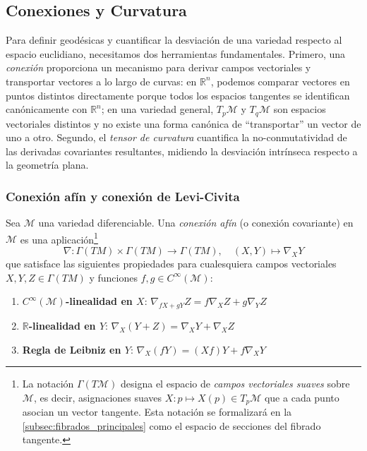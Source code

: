 \subsection{Conexiones y Curvatura}\label{subsec:conexiones_curvatura}

Para definir geodésicas y cuantificar la desviación de una variedad respecto al espacio euclidiano, necesitamos dos herramientas fundamentales. Primero, una \textit{conexión} proporciona un mecanismo para derivar campos vectoriales y transportar vectores a lo largo de curvas: en $\mathbb{R}^n$, podemos comparar vectores en puntos distintos directamente porque todos los espacios tangentes se identifican canónicamente con $\mathbb{R}^n$; en una variedad general, $T_p\mathcal{M}$ y $T_q\mathcal{M}$ son espacios vectoriales distintos y no existe una forma canónica de ``transportar'' un vector de uno a otro. Segundo, el \textit{tensor de curvatura} cuantifica la no-conmutatividad de las derivadas covariantes resultantes, midiendo la desviación intrínseca respecto a la geometría plana.

\subsubsection{Conexión afín y conexión de Levi-Civita}\label{subsec:conexion_levi_civita}

\begin{definition}\label{def:conexion_afin}
Sea $\mathcal{M}$ una variedad diferenciable. Una \textit{conexión afín} (o conexión covariante) en $\mathcal{M}$ es una aplicación\footnote{La notación $\Gamma(T\mathcal{M})$ designa el espacio de \textit{campos vectoriales suaves} sobre $\mathcal{M}$, es decir, asignaciones suaves $X\colon p \mapsto X(p) \in T_p\mathcal{M}$ que a cada punto asocian un vector tangente. Esta notación se formalizará en la \autoref{subsec:fibrados_principales} como el espacio de secciones del fibrado tangente.}
\[
\nabla: \Gamma(TM) \times \Gamma(TM) \to \Gamma(TM), \quad (X, Y) \mapsto \nabla_X Y
\]
que satisface las siguientes propiedades para cualesquiera campos vectoriales $X, Y, Z \in \Gamma(TM)$ y funciones $f, g \in C^\infty(\mathcal{M})$:
\begin{enumerate}
	\item \textbf{$C^\infty(\mathcal{M})$-linealidad en $X$}: $\nabla_{fX + gY} Z = f\nabla_X Z + g\nabla_Y Z$
	\item \textbf{$\mathbb{R}$-linealidad en $Y$}: $\nabla_X(Y + Z) = \nabla_X Y + \nabla_X Z$
	\item \textbf{Regla de Leibniz en $Y$}: $\nabla_X(fY) = (Xf)Y + f\nabla_X Y$
\end{enumerate}
\end{definition}

